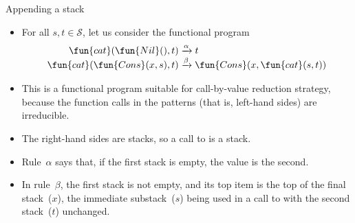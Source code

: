 %
\begin{frame}{Appending a stack}

  \begin{itemize}

    \item For all \(s, t \in \mathcal{S}\), let us consider the
      functional program
      \begin{align*}
        \fun{cat}(\fun{Nil}(),t) & \xrightarrow{\alpha} t\\
        \fun{cat}(\fun{Cons}(x,s),t) &\xrightarrow{\smash\beta}
        \fun{Cons}(x,\fun{cat}(s,t))
      \end{align*}

    \item This is a functional program suitable for
      call\hyp{}by\hyp{}value reduction strategy, because the function
      calls in the patterns (that is, left\hyp{}hand sides) are
      irreducible.

    \item The right\hyp{}hand sides are stacks, so a call to
       is a stack.

    \item Rule~\(\alpha\) says that, if the first stack is empty, the
      value is the second.

    \item In rule~\(\beta\), the first stack is not empty, and its top
      item is the top of the final stack~(\(x\)), the immediate
      substack~(\(s\)) being used in a call to  with the
      second stack~(\(t\)) unchanged.

  \end{itemize}

\end{frame}

